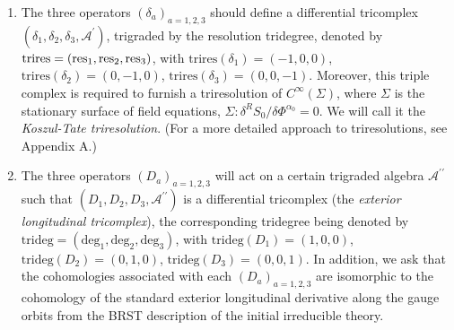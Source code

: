 \documentclass[a4paper,12pt]{article}
\begin{document}
\begin{enumerate}
\item  The three operators $\left( \delta _{a}\right) _{a=1,2,3}$ should
define a differential tricomplex $\left( \delta _{1},\delta _{2},\delta _{3},%
\mathcal{A}^{\prime }\right) $, trigraded by the resolution tridegree,
denoted by $\mathrm{trires}=\left( \mathrm{res}_{1},\mathrm{res}_{2},\mathrm{%
res}_{3}\right) $, with $\mathrm{trires}\left( \delta _{1}\right) =\left(
-1,0,0\right) $, $\mathrm{trires}\left( \delta _{2}\right) =\left(
0,-1,0\right) $, $\mathrm{trires}\left( \delta _{3}\right) =\left(
0,0,-1\right) $. Moreover, this triple complex is required to furnish a
triresolution of $C^{\infty }\left( \Sigma \right) $, where $\Sigma $ is the
stationary surface of field equations, $\Sigma :\delta ^{R}S_{0}/\delta \Phi
^{\alpha _{0}}=0$. We will call it the \textit{Koszul-Tate triresolution}.
(For a more detailed approach to triresolutions, see Appendix A.)

\item  The three operators $\left( D_{a}\right) _{a=1,2,3}$ will act on a
certain trigraded algebra $\mathcal{A}^{\prime \prime }$ such that $\left(
D_{1},D_{2},D_{3},\mathcal{A}^{\prime \prime }\right) $ is a differential
tricomplex (the \textit{exterior longitudinal tricomplex}), the
corresponding tridegree being denoted by $\mathrm{trideg}=\left( \mathrm{deg}%
_{1},\mathrm{deg}_{2},\mathrm{deg}_{3}\right) $, with $\mathrm{trideg}\left(
D_{1}\right) =\left( 1,0,0\right) $, $\mathrm{trideg}\left( D_{2}\right)
=\left( 0,1,0\right) $, $\mathrm{trideg}\left( D_{3}\right) =\left(
0,0,1\right) $. In addition, we ask that the cohomologies associated with
each $\left( D_{a}\right) _{a=1,2,3}$ are isomorphic to the cohomology of
the standard exterior longitudinal derivative along the gauge orbits from
the BRST description of the initial irreducible theory.
\end{enumerate}
\end{document}
